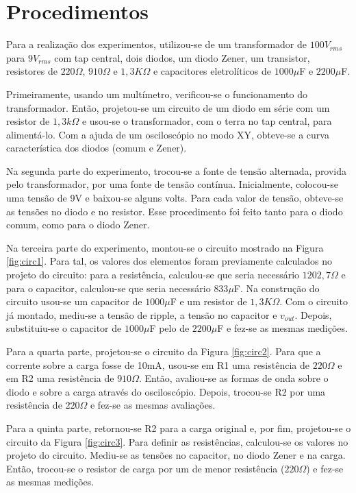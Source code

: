 \documentclass{article}
\begin{document}
\section{Procedimentos}
Para a realização dos experimentos, utilizou-se de um transformador de $100V_{rms}$ para $9V_{rms}$ com tap central, dois diodos, um diodo Zener, um transistor, resistores de $220\Omega$, $910\Omega$ e $1,3K\Omega$ e capacitores eletrolíticos de $1000\mu$F e $2200\mu$F.

Primeiramente, usando um multímetro, verificou-se o funcionamento do transformador. Então, projetou-se um circuito de um diodo em série com um resistor de $1,3k\Omega$ e usou-se o transformador, com o terra no tap central, para alimentá-lo. Com a ajuda de um osciloscópio no modo XY, obteve-se a curva característica dos diodos (comum e Zener).

Na segunda parte do experimento, trocou-se a fonte de tensão alternada, provida pelo transformador, por uma fonte de tensão contínua. Inicialmente, colocou-se uma tensão de 9V e baixou-se alguns volts. Para cada valor de tensão, obteve-se as tensões no diodo e no resistor. Esse procedimento foi feito tanto para o diodo comum, como para o diodo Zener.

Na terceira parte do experimento, montou-se o circuito mostrado na Figura \ref{fig:circ1}. Para tal, os valores dos elementos foram previamente calculados no projeto do circuito: para a resistência, calculou-se que seria necessário $1202,7\Omega$ e para o capacitor, calculou-se que seria necessário $833\mu$F. Na construção do circuito usou-se um capacitor de $1000\mu$F e um resistor de $1,3K\Omega$. Com o circuito já montado, mediu-se a tensão de ripple, a tensão no capacitor e $v_{out}$. Depois, substituiu-se o capacitor de $1000\mu$F pelo de $2200\mu$F e fez-se as mesmas medições.

Para a quarta parte, projetou-se o circuito da Figura \ref{fig:circ2}. Para que a corrente sobre a carga fosse de 10mA, usou-se em R1 uma resistência de $220\Omega$ e em R2 uma resistência de $910\Omega$. Então, avaliou-se as formas de onda sobre o diodo e sobre a carga através do osciloscópio. Depois, trocou-se R2 por uma resistência de $220\Omega$ e fez-se as mesmas avaliações.

Para a quinta parte, retornou-se R2 para a carga original e, por fim, projetou-se o circuito da Figura \ref{fig:circ3}. Para definir as resistências, calculou-se os valores no projeto do circuito. Mediu-se as tensões no capacitor, no diodo Zener e na carga. Então, trocou-se o resistor de carga por um de menor resistência ($220\Omega$) e fez-se as mesmas medições.
\end{document}
